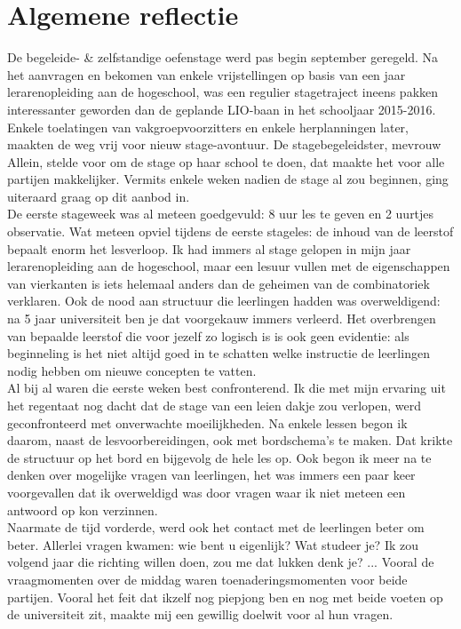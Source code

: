 \documentclass[a4paper,11pt]{article}
\theoremstyle{definition}
\begin{document}
\newpage
\section{Algemene reflectie}
De begeleide- \& zelfstandige oefenstage werd pas begin september geregeld. Na 
het aanvragen en bekomen van enkele vrijstellingen op basis van een jaar 
lerarenopleiding aan de hogeschool, was een regulier stagetraject ineens pakken 
interessanter geworden dan de geplande LIO-baan in het schooljaar 2015-2016. 
Enkele toelatingen van vakgroepvoorzitters en enkele herplanningen later, maakten 
de weg vrij voor nieuw stage-avontuur. De stagebegeleidster, mevrouw Allein, 
stelde voor om de stage op haar school te doen, dat maakte het voor alle 
partijen makkelijker. Vermits enkele weken nadien de stage al zou beginnen, ging 
uiteraard graag op dit aanbod in.\\

\noindent De eerste stageweek was al meteen goedgevuld: 8 uur les te geven en 2 
uurtjes observatie. Wat meteen opviel tijdens de eerste stageles: de inhoud van 
de leerstof bepaalt enorm het lesverloop. Ik had immers al stage gelopen in mijn 
jaar lerarenopleiding aan de hogeschool, maar een lesuur vullen met de 
eigenschappen van vierkanten is iets helemaal anders dan de geheimen van de 
combinatoriek verklaren. Ook de nood aan structuur die leerlingen hadden was 
overweldigend: na 5 jaar universiteit ben je dat voorgekauw immers verleerd. Het 
overbrengen van bepaalde leerstof die voor jezelf zo logisch is is ook geen 
evidentie: als beginneling is het niet altijd goed in te schatten welke 
instructie de leerlingen nodig hebben om nieuwe concepten te vatten.\\

\noindent Al bij al waren die eerste weken best confronterend. Ik die met mijn 
ervaring uit het regentaat nog dacht dat de stage van een leien dakje zou 
verlopen, werd geconfronteerd met onverwachte moeilijkheden. Na enkele lessen 
begon ik daarom, naast de lesvoorbereidingen, ook met bordschema's te maken. Dat 
krikte de structuur op het bord en bijgevolg de hele les op. Ook begon ik meer 
na te denken over mogelijke vragen van leerlingen, het was immers een paar keer 
voorgevallen dat ik overweldigd was door vragen waar ik niet meteen een antwoord 
op kon verzinnen. \\

\noindent Naarmate de tijd vorderde, werd ook het contact met de leerlingen 
beter om beter. Allerlei vragen kwamen: wie bent u eigenlijk? Wat studeer je? Ik 
zou volgend jaar die richting willen doen, zou me dat lukken denk je? ... Vooral 
de vraagmomenten over de middag waren toenaderingsmomenten voor beide partijen. 
Vooral het feit dat ikzelf nog piepjong ben en nog met beide voeten op de 
universiteit zit, maakte mij een gewillig doelwit voor al hun vragen. \\
\end{document}

